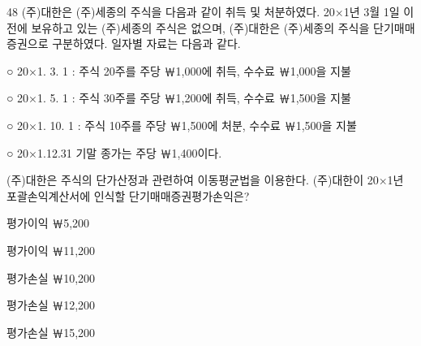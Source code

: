 \begin{question}{48}
(주)대한은 (주)세종의 주식을 다음과 같이 취득 및 처분하였다. 20×1년 3월 1일 이전에 보유하고 있는 (주)세종의 주식은 없으며, (주)대한은 (주)세종의 주식을 단기매매증권으로 구분하였다. 일자별 자료는 다음과 같다.
\begin{framedtext}
○ 20×1. 3. 1 : 주식 20주를 주당 ￦1,000에 취득, 수수료 ￦1,000을 지불 \par
○ 20×1. 5. 1 : 주식 30주를 주당 ￦1,200에 취득, 수수료 ￦1,500을 지불 \par
○ 20×1. 10. 1 : 주식 10주를 주당 ￦1,500에 처분, 수수료 ￦1,500을 지불 \par
○ 20×1.12.31 기말 종가는 주당 ￦1,400이다. \par
\end{framedtext}
(주)대한은 주식의 단가산정과 관련하여 이동평균법을 이용한다. (주)대한이 20×1년 포괄손익계산서에 인식할 단기매매증권평가손익은?
\begin{choices}
  \item 평가이익 ￦5,200
  \item 평가이익 ￦11,200
  \item 평가손실 ￦10,200
  \item 평가손실 ￦12,200
  \item 평가손실 ￦15,200
\end{choices}
\end{question}
